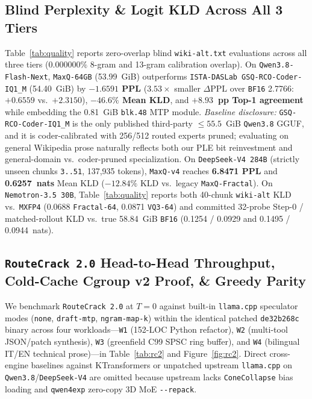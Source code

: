 \documentclass[10pt,twocolumn]{article}
\begin{document}
\subsection{Blind Perplexity \& Logit KLD Across All 3 Tiers}
Table~\ref{tab:quality} reports zero-overlap blind \texttt{wiki-alt.txt} evaluations across all three tiers ($0.000000\%$ 8-gram and 13-gram calibration overlap). On \texttt{Qwen3.8-Flash-Next}, \texttt{MaxQ-64GB} (53.99~GiB) outperforms \texttt{ISTA-DASLab GSQ-RCO-Coder-IQ1\_M} (54.40~GiB) by \textbf{$-1.6591$ PPL} ($3.53\times$ smaller $\Delta\text{PPL}$ over \texttt{BF16} 2.7766: $+0.6559$ vs.\ $+2.3150$), \textbf{$-46.6\%$ Mean KLD}, and \textbf{$+8.93$~pp Top-1 agreement} while embedding the 0.81~GiB \texttt{blk.48} MTP module. \emph{Baseline disclosure:} \texttt{GSQ-RCO-Coder-IQ1\_M} is the only published third-party $\le 55.5$~GiB \texttt{Qwen3.8} GGUF, and it is coder-calibrated with 256/512 routed experts pruned; evaluating on general Wikipedia prose naturally reflects both our PLE bit reinvestment and general-domain vs.\ coder-pruned specialization. On \texttt{DeepSeek-V4 284B} (strictly unseen chunks \texttt{3..51}, 137,935 tokens), \texttt{MaxQ-v4} reaches \textbf{6.8471 PPL} and \textbf{0.6257~nats} Mean KLD ($-12.84\%$ KLD vs.\ legacy \texttt{MaxQ-Fractal}). On \texttt{Nemotron-3.5 30B}, Table~\ref{tab:quality} reports both 40-chunk \texttt{wiki-alt} KLD vs.\ \texttt{MXFP4} (0.0688 \texttt{Fractal-64}, 0.0871 \texttt{VQ3-64}) and committed 32-probe Step-0 / matched-rollout KLD vs.\ true 58.84~GiB \texttt{BF16} (0.1254 / 0.0929 and 0.1495 / 0.0944~nats).

\subsection{\texttt{RouteCrack 2.0} Head-to-Head Throughput, Cold-Cache Cgroup v2 Proof, \& Greedy Parity}
We benchmark \texttt{RouteCrack 2.0} at $T=0$ against built-in \texttt{llama.cpp} speculator modes (\texttt{none}, \texttt{draft-mtp}, \texttt{ngram-map-k}) within the identical patched \texttt{de32b268c} binary across four workloads---\texttt{W1} (152-LOC Python refactor), \texttt{W2} (multi-tool JSON/patch synthesis), \texttt{W3} (greenfield C99 SPSC ring buffer), and \texttt{W4} (bilingual IT/EN technical prose)---in Table~\ref{tab:rc2} and Figure~\ref{fig:rc2}. Direct cross-engine baselines against KTransformers or unpatched upstream \texttt{llama.cpp} on \texttt{Qwen3.8}/\texttt{DeepSeek-V4} are omitted because upstream lacks \texttt{ConeCollapse} bias loading and \texttt{qwen4exp} zero-copy 3D MoE \texttt{{-}{-}repack}.
\end{document}
